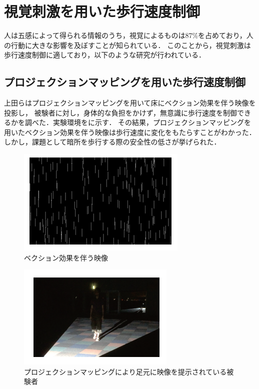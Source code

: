 \section{視覚刺激を用いた歩行速度制御}
人は五感によって得られる情報のうち，視覚によるものは87\%を占めており，人の行動に大きな影響を及ぼすことが知られている\cite{syomei}．
このことから，視覚刺激は歩行速度制御に適しており，以下のような研究が行われている．
\subsection{プロジェクションマッピングを用いた歩行速度制御}
上田らはプロジェクションマッピングを用いて床にベクション効果を伴う映像を投影し，
被験者に対し，身体的な負担をかけず，無意識に歩行速度を制御できるかを調べた\cite{ueda}．実験環境をに示す．
その結果，プロジェクションマッピングを用いたベクション効果を伴う映像は歩行速度に変化をもたらすことがわかった．
しかし，課題として暗所を歩行する際の安全性の低さが挙げられた．
\begin{figure}[H]
    \centering
    \includegraphics[clip, width=0.6\linewidth]{fig/4.PNG}
    \caption{ベクション効果を伴う映像}
    \label{fig:4}
\end{figure}
\begin{figure}[H]
    \centering
    \includegraphics[clip, width=0.6\linewidth]{fig/3.PNG}
    \caption{プロジェクションマッピングにより足元に映像を提示されている被験者}
    \label{fig:3}
\end{figure}






